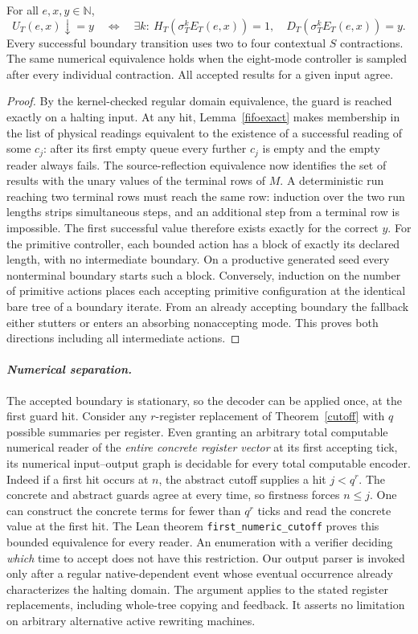 \begin{theorem}\label{certnumeric}
For all \(e,x,y\in\mathbb N\),
\[
 U_T(e,x)\downarrow=y\quad\Longleftrightarrow\quad
 \exists k:\ H_T(\sigma_T^k E_T(e,x))=1,\quad D_T(\sigma_T^k E_T(e,x))=y .
\]
Every successful boundary transition uses two to four contextual \(S\) contractions. The same numerical equivalence holds when the eight-mode controller is sampled after every individual contraction. All accepted results for a given input agree.
\end{theorem}
\begin{proof}
By the kernel-checked regular domain equivalence, the guard is reached exactly on a halting input. At any hit, Lemma~\ref{fifoexact} makes membership in the list of physical readings equivalent to the existence of a successful reading of some \(c_j\): after its first empty queue every further \(c_j\) is empty and the empty reader always fails. The source-reflection equivalence now identifies the set of results with the unary values of the terminal rows of \(M\). A deterministic run reaching two terminal rows must reach the same row: induction over the two run lengths strips simultaneous steps, and an additional step from a terminal row is impossible. The first successful value therefore exists exactly for the correct \(y\). For the primitive controller, each bounded action has a block of exactly its declared length, with no intermediate boundary. On a productive generated seed every nonterminal boundary starts such a block. Conversely, induction on the number of primitive actions places each accepting primitive configuration at the identical bare tree of a boundary iterate. From an already accepting boundary the fallback either stutters or enters an absorbing nonaccepting mode. This proves both directions including all intermediate actions.
\end{proof}

\paragraph{\textit{Numerical separation.}}
The accepted boundary is stationary, so the decoder can be applied once, at the first guard hit. Consider any \(r\)-register replacement of Theorem~\ref{cutoff} with \(q\) possible summaries per register. Even granting an arbitrary total computable numerical reader of the \emph{entire concrete register vector} at its first accepting tick, its numerical input--output graph is decidable for every total computable encoder. Indeed if a first hit occurs at \(n\), the abstract cutoff supplies a hit \(j<q^r\). The concrete and abstract guards agree at every time, so firstness forces \(n\le j\). One can construct the concrete terms for fewer than \(q^r\) ticks and read the concrete value at the first hit. The Lean theorem \texttt{first\_numeric\_cutoff} proves this bounded equivalence for every reader. An enumeration with a verifier deciding \emph{which} time to accept does not have this restriction. Our output parser is invoked only after a regular native-dependent event whose eventual occurrence already characterizes the halting domain. The argument applies to the stated register replacements, including whole-tree copying and feedback. It asserts no limitation on arbitrary alternative active rewriting machines.
